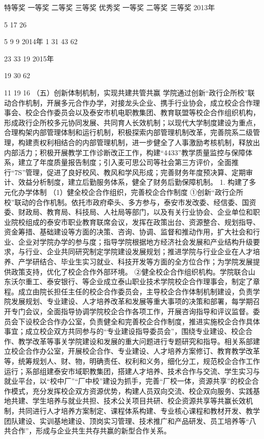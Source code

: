 特等奖
一等奖
二等奖
三等奖
优秀奖
一等奖
二等奖
三等奖
2013年

5
17
26

5
9
9
2014年
1
31
43
62

23
33
19
2015年

19
30
62

11
19
16
（五）创新体制机制，实现共建共管共赢
学院通过创新“政行企所校”联动合作机制，开展多元合作办学，对接龙头企业、携手行业协会，成立校企合作理事会、校企合作委员会以及泰安市机电职教集团、教育联盟等校企合作组织机构，形成政行企所校多元协同发展、共同育人长效机制；以现代大学制度建设为重点，合理构架内部管理体制和运行机制，积极探索内部管理机制改革，完善院系二级管理，构建责权利相结合的内部管理机制，进一步健全了人事激励考核机制，释放出内部活力；积极开展教学工作诊断改正工作，构建“4433”教学质量监控与保障体系，建立了年度质量报告制度；引入麦可思公司等社会第三方评价，全面推行“7S”管理，促进了良好校风、教风和学风形成；完善财务年度预决算、定期审计、效益分析制度，建立后勤服务体系，健全了财务后勤保障机制。
1. 构建了多元化办学体制
（1）健全校企合作组织，完善校企合作制度
①创新“政行企所校”联动的合作机制。依托市政府牵头、多方参与，泰安市发改委、经信委、国资委、财政局、教育局、科技局、人社局等部门，以及有关行业协会、企业单位和职业院校组成的泰安市职业教育联席会议，发挥在政策出台、资源整合、规划指导、资金筹措、基础建设等方面的决策、咨询、协调、监督和推动作用，扩大社会和行业、企业对学院办学的参与度；指导学院根据地方经济社会发展和产业结构升级要求，与行业、企业共同研究制定学院建设发展规划；推进学院与行业企业在人才培养、产学研结合、毕业生实习就业、科技开发等方面的全方位合作；为学院发展提供政策支持，优化了校企合作外部环境。
②健全校企合作组织机构。学院联合山东沃尔重工、泰安银行、等企业成立泰山职业技术学院校企合作理事会，制定了章程。成立由院长担任主任的校企合作委员会，主导校企合作体制机制建设，负责学院发展规划、专业建设、人才培养改革和发展等重大事项的决策和部署，每学期召开专门会议，全面指导协调学院校企合作各项工作，开展咨询指导和评议监督。委员会下设校企合作办公室，负责健全和完善校企合作制度，推进实施校企合作具体事宜；成立校企双方共同参与的“专业建设指导委员会”，围绕专业建设、校企合作、教学改革等事关学院建设和发展的重大问题进行专题研究和指导。相关系部建立校企合作办公室，开展校企合作、专业建设、人才培养方案修订、教育教学改革等，统筹规划人、财、物，明确责任、权利和义务，细化分工，规范校企合作工作运行；系部组建泰安市域职教集团，搭建人才培养、技术合作与交流、学生实习与就业平台，以“校中厂”“厂中校”建设为抓手，完善“厂校一体，资源共享”的校企合作模式，充分发挥校企双方资源优势，构建人员双向交流、校企双向服务、实践基地共建、学生培养与就业共担、技术公关项目共研、校企资源共享等共赢长效机制，共同进行人才培养方案制定、课程体系构建、专业核心课程和教材开发、教学团队建设、实训基地建设、顶岗实习管理、技术推广和产品研发、员工培养等“八共合作”，形成与企业共生共存共赢的新型合作关系。
